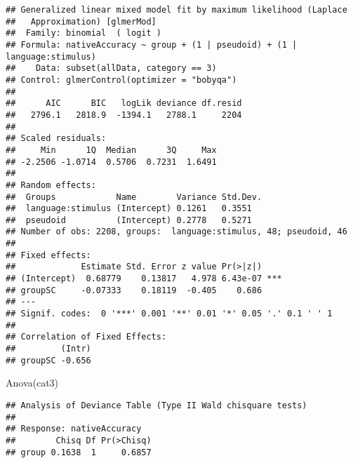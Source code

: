 \documentclass[
]{article}
\newenvironment{Shaded}{\begin{snugshade}}{\end{snugshade}}
\newcommand{\AttributeTok}[1]{\textcolor[rgb]{0.77,0.63,0.00}{#1}}
\newcommand{\DecValTok}[1]{\textcolor[rgb]{0.00,0.00,0.81}{#1}}
\newcommand{\FunctionTok}[1]{\textcolor[rgb]{0.00,0.00,0.00}{#1}}
\newcommand{\NormalTok}[1]{#1}
\newcommand{\OtherTok}[1]{\textcolor[rgb]{0.56,0.35,0.01}{#1}}
\newcommand{\SpecialCharTok}[1]{\textcolor[rgb]{0.00,0.00,0.00}{#1}}
\newcommand{\StringTok}[1]{\textcolor[rgb]{0.31,0.60,0.02}{#1}}
\begin{document}
\begin{verbatim}
## Generalized linear mixed model fit by maximum likelihood (Laplace
##   Approximation) [glmerMod]
##  Family: binomial  ( logit )
## Formula: nativeAccuracy ~ group + (1 | pseudoid) + (1 | language:stimulus)
##    Data: subset(allData, category == 3)
## Control: glmerControl(optimizer = "bobyqa")
## 
##      AIC      BIC   logLik deviance df.resid 
##   2796.1   2818.9  -1394.1   2788.1     2204 
## 
## Scaled residuals: 
##     Min      1Q  Median      3Q     Max 
## -2.2506 -1.0714  0.5706  0.7231  1.6491 
## 
## Random effects:
##  Groups            Name        Variance Std.Dev.
##  language:stimulus (Intercept) 0.1261   0.3551  
##  pseudoid          (Intercept) 0.2778   0.5271  
## Number of obs: 2208, groups:  language:stimulus, 48; pseudoid, 46
## 
## Fixed effects:
##             Estimate Std. Error z value Pr(>|z|)    
## (Intercept)  0.68779    0.13817   4.978 6.43e-07 ***
## groupSC     -0.07333    0.18119  -0.405    0.686    
## ---
## Signif. codes:  0 '***' 0.001 '**' 0.01 '*' 0.05 '.' 0.1 ' ' 1
## 
## Correlation of Fixed Effects:
##         (Intr)
## groupSC -0.656
\end{verbatim}

\begin{Shaded}
\begin{Highlighting}[]
\FunctionTok{Anova}\NormalTok{(cat3)}
\end{Highlighting}
\end{Shaded}

\begin{verbatim}
## Analysis of Deviance Table (Type II Wald chisquare tests)
## 
## Response: nativeAccuracy
##        Chisq Df Pr(>Chisq)
## group 0.1638  1     0.6857
\end{verbatim}

\begin{Shaded}
\end{Shaded}
\end{document}
